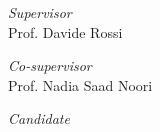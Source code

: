 \documentclass[../thesis.tex]{subfiles}
\begin{document}
    \begin{titlepage}
        \begin{center}
            \begin{LARGE}
                \textbf{\myUni}\\
            \end{LARGE}

            \vspace{10pt}

            \begin{large}
                \textsc{\myDepartment}\\
                \textsc{\myFaculty}\\
            \end{large}

            \vspace{10pt}

            \begin{LARGE}
                \begin{center}
                    \textbf{\myTitle}\\
                \end{center}
            \end{LARGE}

            \begin{large}
                \textsl{\myDegree}\\
            \end{large}

            \vspace{30pt}

            \begin{large}
                \begin{flushleft}
                    \textit{Supervisor}\\
                    \vspace{1pt}
                    Prof. Davide Rossi
                \end{flushleft}
                \begin{flushleft}
                    \textit{Co-supervisor}\\
                    \vspace{1pt}
                    Prof. Nadia Saad Noori
                \end{flushleft}
            
                \vspace{0pt} 

                \begin{flushright}
                    \textit{Candidate}\\
                    \vspace{1pt}
                    \myName
                \end{flushright}
            \end{large}


\end{center}
\end{titlepage}
\end{document}
